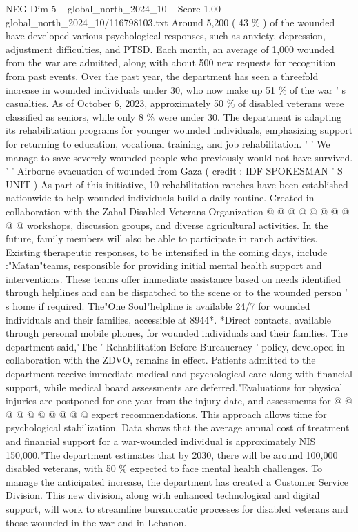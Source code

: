 \begin{textsample}{NEG Dim 5 – global\_north\_2024\_10 – Score 1.00 – global\_north\_2024\_10/116798103.txt}  \label{ex:f5_neg_050}
Around 5,200 ( 43 \% ) of the wounded have developed various psychological responses, such as anxiety, depression, adjustment difficulties, and PTSD.
Each month, an average of 1,000 wounded from the war are admitted, along with about 500 new requests for recognition from past events.
Over the past year, the department has seen a threefold increase in wounded individuals under 30, who now make up 51 \% of the war ' s casualties.
As of October 6, 2023, approximately 50 \% of disabled veterans were classified as seniors, while only 8 \% were under 30.
The department is adapting its rehabilitation programs for younger wounded individuals, emphasizing support for returning to education, vocational training, and job rehabilitation. ' ' We manage to save severely wounded people who previously would not have survived. ' ' Airborne evacuation of wounded from Gaza ( credit : IDF SPOKESMAN ' S UNIT ) As part of this initiative, 10 rehabilitation ranches have been established nationwide to help wounded individuals build a daily routine.
Created in collaboration with the Zahal Disabled Veterans Organization @ @ @ @ @ @ @ @ @ @ workshops, discussion groups, and diverse agricultural activities.
In the future, family members will also be able to participate in ranch activities.
Existing therapeutic responses, to be intensified in the coming days, include :"Matan"teams, responsible for providing initial mental health support and interventions.
These teams offer immediate assistance based on needs identified through helplines and can be dispatched to the scene or to the wounded person ' s home if required.
The"One Soul"helpline is available 24/7 for wounded individuals and their families, accessible at 8944*. *Direct contacts, available through personal mobile phones, for wounded individuals and their families.
The department said,"The ' Rehabilitation Before Bureaucracy ' policy, developed in collaboration with the ZDVO, remains in effect.
Patients admitted to the department receive immediate medical and psychological care along with financial support, while medical board assessments are deferred."Evaluations for physical injuries are postponed for one year from the injury date, and assessments for @ @ @ @ @ @ @ @ @ @ expert recommendations.
This approach allows time for psychological stabilization.
Data shows that the average annual cost of treatment and financial support for a war-wounded individual is approximately NIS 150,000."The department estimates that by 2030, there will be around 100,000 disabled veterans, with 50 \% expected to face mental health challenges.
To manage the anticipated increase, the department has created a Customer Service Division.
This new division, along with enhanced technological and digital support, will work to streamline bureaucratic processes for disabled veterans and those wounded in the war and in Lebanon.

\end{textsample}
